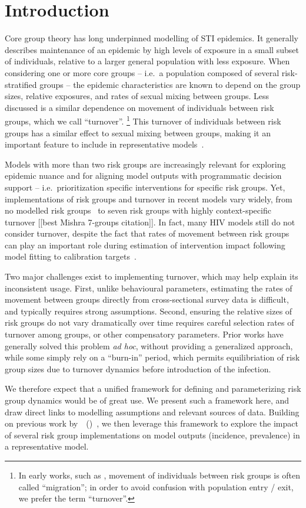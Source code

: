 \documentclass[10pt]{article}
\numberwithin{equation}{section}
\newcommand{\citet}[1]{\citeauthor{#1}~(\citeyear{#1})~\cite{#1}}
\begin{document}
\section{Introduction}\label{s:intro}
Core group theory has long underpinned modelling of STI epidemics.
It generally describes maintenance of an epidemic by
high levels of exposure in a small subset of individuals,
relative to a larger general population with less exposure. %
When considering one or more core groups
-- i.e.\ a population composed of several risk-stratified groups --
the epidemic characteristics are known to depend on
the group sizes, relative exposures, and rates of sexual mixing between groups.
Less discussed is a similar dependence on
movement of individuals between risk groups, which we call ``turnover''.%
\footnote{In early works, such as \cite{Stigum1994},
  movement of individuals between risk groups is often called ``migration'';
  in order to avoid confusion with population entry / exit,
  we prefer the term ``turnover''.}
This turnover of individuals between risk groups has a similar effect to
sexual mixing between groups, making it
an important feature to include in representative models~\cite{Stigum1994}.
\par
Models with more than two risk groups
are increasingly relevant for exploring epidemic nuance
and for aligning model outputs with programmatic decision support
-- i.e.\ prioritization specific interventions for specific risk groups. %
Yet, implementations of risk groups and turnover in recent models vary widely,
from no modelled risk groups~\cite{Estill2012,Barnighausen2012}
to seven risk groups with highly context-specific turnover [[best Mishra 7-groups citation]].
In fact, many HIV models still do not consider turnover,
despite the fact that rates of movement between risk groups
can play an important role during estimation of intervention impact
following model fitting to calibration targets~\cite{Eaton2014}.
\par
Two major challenges exist to implementing turnover,
which may help explain its inconsistent usage.
First, unlike behavioural parameters,
estimating the rates of movement between groups
directly from cross-sectional survey data is difficult,
and typically requires strong assumptions.
Second, ensuring the relative sizes of risk groups do not vary
dramatically over time requires
careful selection rates of turnover among groups,
or other compensatory parameters.
Prior works have generally solved this problem \textit{ad hoc},
without providing a generalized approach,
while some simply rely on a ``burn-in'' period,
which permits equilibriation of risk group sizes due to turnover dynamics
before introduction of the infection.
\par
We therefore expect that a unified framework for
defining and parameterizing risk group dynamics
would be of great use.
We present such a framework here,
and draw direct links to modelling assumptions and relevant sources of data.
Building on previous work by~\citet{Stigum1994},
we then leverage this framework to explore the impact of
several risk group implementations on model outputs (incidence, prevalence)
in a representative model.
\end{document}
